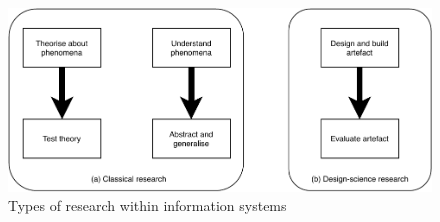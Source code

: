 \begin{figure}[!htb]
  \includegraphics[width=0.9\columnwidth]{fig/TypesOfResearch.pdf}
  \caption{Types of research within information systems}
  \label{fig:typesofresearch}
\end{figure}
